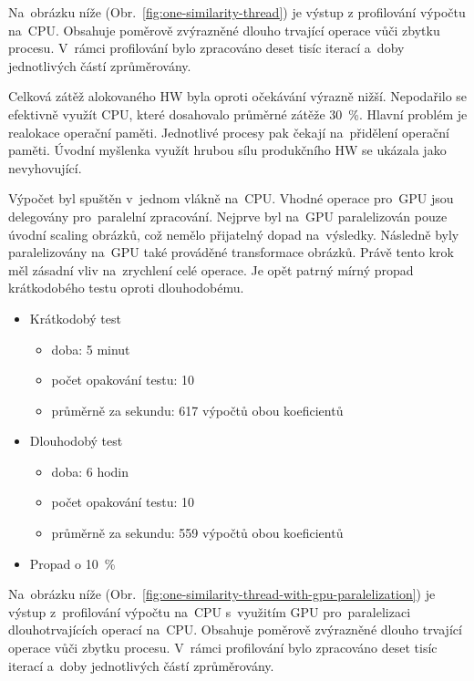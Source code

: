 Na~obrázku níže (Obr.~\ref{fig:one-similarity-thread}) je výstup z profilování výpočtu na~CPU. Obsahuje poměrově zvýrazněné dlouho trvající operace vůči zbytku procesu. V~rámci profilování bylo zpracováno deset tisíc iterací a~doby jednotlivých částí zprůměrovány.

Celková zátěž alokovaného HW byla oproti očekávání výrazně nižší. Nepodařilo se efektivně využít CPU, které dosahovalo průměrné zátěže 30~\%. Hlavní problém je realokace operační paměti. Jednotlivé procesy pak čekají na~přidělení operační paměti. Úvodní myšlenka využít hrubou sílu produkčního HW se ukázala jako nevyhovující.

Výpočet byl spuštěn v~jednom vlákně na~CPU. Vhodné operace pro~GPU jsou delegovány pro~paralelní zpracování.
Nejprve byl na~GPU paralelizován pouze úvodní scaling obrázků, což nemělo přijatelný dopad na~výsledky. Následně byly paralelizovány na~GPU také prováděné transformace obrázků. Právě tento krok měl zásadní vliv na~zrychlení celé operace.
Je opět patrný mírný propad krátkodobého testu oproti dlouhodobému.
\begin{itemize}
	\setlength{\parskip}{0pt}
	\setlength{\itemsep}{0pt}
	\item {Krátkodobý test}
		\begin{itemize}
			\setlength{\parskip}{0pt}
			\setlength{\itemsep}{0pt}
			\item {doba: 5 minut}
			\item {počet opakování testu: 10}
			\item {průměrně za sekundu: 617 výpočtů obou koeficientů}
		\end{itemize}
	\item {Dlouhodobý test}
		\begin{itemize}
			\setlength{\parskip}{0pt}
			\setlength{\itemsep}{0pt}
			\item {doba: 6 hodin}
			\item {počet opakování testu: 10}
			\item {průměrně za sekundu: 559 výpočtů obou koeficientů}
		\end{itemize}
	\item {Propad o 10~\%}
\end{itemize}

Na~obrázku níže (Obr.~\ref{fig:one-similarity-thread-with-gpu-paralelization}) je výstup z~profilování výpočtu na~CPU s~využitím GPU pro~paralelizaci dlouhotrvajících operací na~CPU. Obsahuje poměrově zvýrazněné dlouho trvající operace vůči zbytku procesu. V~rámci profilování bylo zpracováno deset tisíc iterací a~doby jednotlivých částí zprůměrovány.

